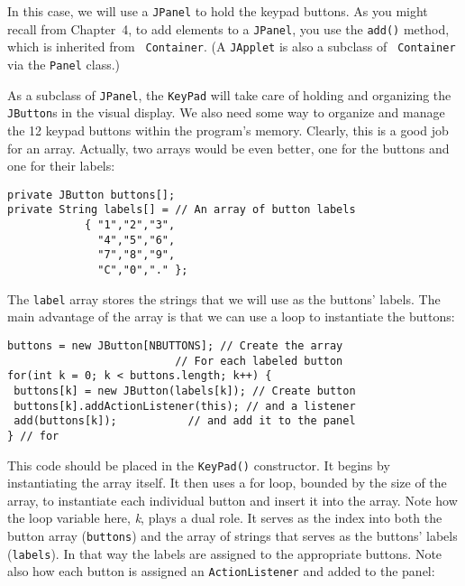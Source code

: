 In this case, we will use a {\tt JPanel} to hold the keypad buttons.
As you might recall from Chapter~4, to add elements to a {\tt JPanel},
you use the {\tt add()} method, which is inherited from {\tt
Container}.  (A {\tt JApplet} is also a subclass of {\tt
Container} via the {\tt Panel} class.)

As a subclass of {\tt JPanel}, the {\tt KeyPad} will take care of
holding and organizing the {\tt JButton}s in the visual
display. We also need some way to organize and manage the 12 keypad
buttons within the program's memory. Clearly, this is a good job for an
array. Actually, two arrays would be even better, one for the buttons
and one for their labels:

\begin{jjjlisting}
\begin{lstlisting}
private JButton buttons[];
private String labels[] = // An array of button labels
            { "1","2","3",
              "4","5","6",
              "7","8","9",
              "C","0","." };
\end{lstlisting}
\end{jjjlisting}

\noindent The {\tt label} array stores the strings that we will
use as the buttons' labels.  The main advantage of the array is that
we can use a loop to instantiate the buttons:

\begin{jjjlisting}
\begin{lstlisting}
buttons = new JButton[NBUTTONS]; // Create the array
                          // For each labeled button
for(int k = 0; k < buttons.length; k++) { 
 buttons[k] = new JButton(labels[k]); // Create button
 buttons[k].addActionListener(this); // and a listener
 add(buttons[k]);           // and add it to the panel
} // for
\end{lstlisting}
\end{jjjlisting}

\noindent This code should be placed in the {\tt KeyPad()}
constructor. It begins by instantiating the array itself. It then uses
a for loop, bounded by the size of the array, to instantiate each
individual button and insert it into the array. Note how the loop
variable here, {\em k}, plays a dual role. It serves as the index into
both the button array ({\tt buttons}) and the array of strings that
serves as the buttons' labels ({\tt labels}). In that way the labels
are assigned to the appropriate buttons. Note also how each button is
assigned an {\tt ActionListener} and added to the panel:

